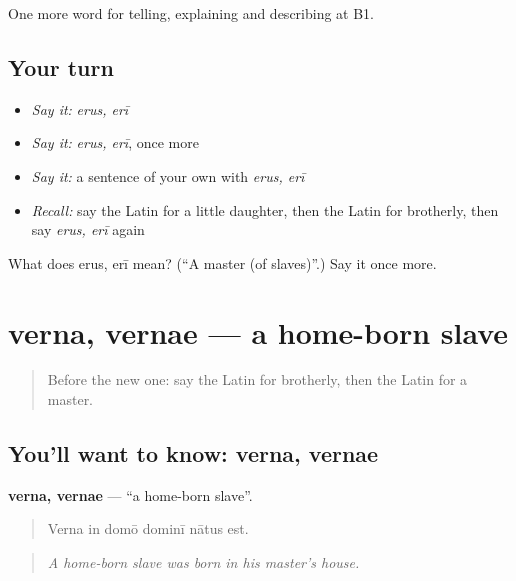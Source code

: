 \begin{grammarlens}[title={What you've built}]
One more word for telling, explaining and describing at B1.
\end{grammarlens}

\subsection*{Your turn}
\begin{itemize}
\raggedright
  \item \emph{Say it:} \emph{erus, erī}
  \item \emph{Say it:} \emph{erus, erī}, once more
  \item \emph{Say it:} a sentence of your own with \emph{erus, erī}
  \item \emph{Recall:} say the Latin for a little daughter, then the Latin for brotherly, then say \emph{erus, erī} again
\end{itemize}

\begin{tcolorbox}[breakable,colback=teal!4,colframe=teal!35!black,title={Before you move on}]
What does erus, erī mean? (\textquotedblleft{}A master (of slaves)\textquotedblright{}.) Say it once more.
\end{tcolorbox}
\section[verna, vernae]{verna, vernae — a home-born slave}

\label{lesson:LA-C530-verna}



\begin{quote}
Before the new one: say the Latin for brotherly, then the Latin for a master.
\end{quote}

\subsection*{You'll want to know: verna, vernae}
\textbf{verna, vernae} — \textquotedblleft{}a home-born slave\textquotedblright{}.

\begin{quote}
Verna in domō dominī nātus est.
\end{quote}

\begin{quote}
\emph{A home-born slave was born in his master's house.}
\end{quote}

